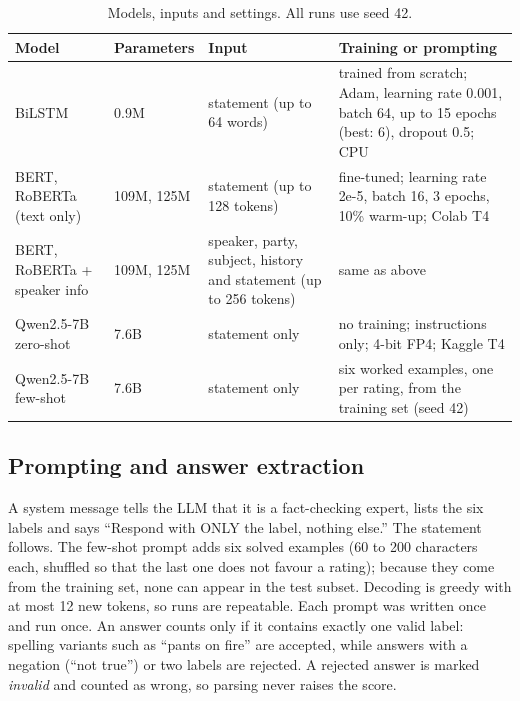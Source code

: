 \documentclass[10pt,a4paper,twoside]{article}
\begin{document}
\begin{table}[H]
\centering\small
\caption{Models, inputs and settings. All runs use seed 42.}
\label{tab:models}
\begin{tabularx}{\linewidth}{>{\raggedright\arraybackslash}p{2.7cm} >{\raggedright\arraybackslash}p{1.3cm} >{\raggedright\arraybackslash}p{3.5cm} X}
\toprule
Model & Parameters & Input & Training or prompting \\
\midrule
BiLSTM & 0.9M & statement (up to 64 words) & trained from scratch; Adam, learning rate 0.001, batch 64, up to 15 epochs (best: 6), dropout 0.5; CPU \\
BERT, RoBERTa (text only) & 109M, 125M & statement (up to 128 tokens) & fine-tuned; learning rate 2e-5, batch 16, 3 epochs, 10\% warm-up; Colab T4 \\
BERT, RoBERTa + speaker info & 109M, 125M & speaker, party, subject, history and statement (up to 256 tokens) & same as above \\
Qwen2.5-7B zero-shot & 7.6B & statement only & no training; instructions only; 4-bit FP4; Kaggle T4 \\
Qwen2.5-7B few-shot & 7.6B & statement only & six worked examples, one per rating, from the training set (seed 42) \\
\bottomrule
\end{tabularx}
\end{table}

\subsection{Prompting and answer extraction}
A system message tells the LLM that it is a fact-checking expert, lists the six labels and says ``Respond with ONLY the label, nothing else.'' The statement follows. The few-shot prompt adds six solved examples (60 to 200 characters each, shuffled so that the last one does not favour a rating); because they come from the training set, none can appear in the test subset. Decoding is greedy with at most 12 new tokens, so runs are repeatable. Each prompt was written once and run once. An answer counts only if it contains exactly one valid label: spelling variants such as ``pants on fire'' are accepted, while answers with a negation (``not true'') or two labels are rejected. A rejected answer is marked \emph{invalid} and counted as wrong, so parsing never raises the score.
\end{document}

